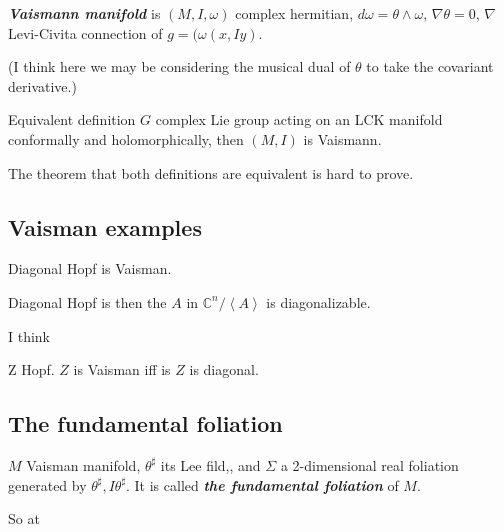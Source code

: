\begin{defn}\leavevmode
\textit{\textbf{Vaismann manifold}} is \((M,I,\omega)\) complex hermitian, \(d\omega =\theta \wedge \omega\), \(\nabla\theta=0\), \(\nabla\) Levi-Civita connection of \(g=(\omega(x,Iy)\).

{\color{7}(I think here we may be considering the musical dual of \(\theta\) to take the covariant derivative.)}
\end{defn}

\begin{thing6}{Equivalent definition}\leavevmode
\(G \) complex Lie group acting on an LCK manifold conformally and holomorphically, then  \((M,I)\) is Vaismann.
\end{thing6}

\begin{remark}\leavevmode
The theorem that both definitions are equivalent is hard to prove.
\end{remark}

\subsection{Vaisman examples}
\begin{thm}\leavevmode
Diagonal Hopf is Vaisman.
\end{thm}

Diagonal Hopf is then the \(A\) in \(\mathbb{C}^n/\left<A\right>\) is diagonalizable.

I think

\begin{thm}\leavevmode
Z Hopf. \(Z\) is Vaisman iff is \(Z\) is diagonal.
\end{thm}

\subsection{The fundamental foliation}

\begin{defn}\leavevmode
\(M\) Vaisman manifold, \(\theta ^\sharp\) its Lee fild,, and \(\Sigma\) a 2-dimensional real foliation generated by \(\theta ^\sharp, I\theta ^\sharp\). It is called \textit{\textbf{the fundamental foliation}} of \(M\).
\end{defn}

\begin{question}\leavevmode
So at 
\end{question}

